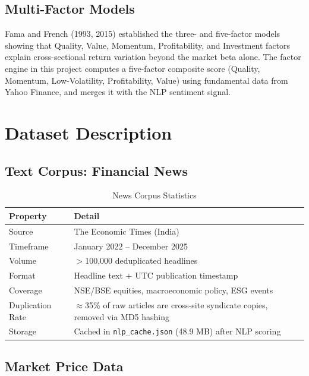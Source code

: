 \documentclass[12pt, a4paper]{article}
\begin{document}
\subsection{Multi-Factor Models}

Fama and French (1993, 2015) established the three- and five-factor models showing that Quality, Value, Momentum, Profitability, and Investment factors explain cross-sectional return variation beyond the market beta alone. The factor engine in this project computes a five-factor composite score (Quality, Momentum, Low-Volatility, Profitability, Value) using fundamental data from Yahoo Finance, and merges it with the NLP sentiment signal.

\section{Dataset Description}

\subsection{Text Corpus: Financial News}

\begin{table}[H]
\centering
\caption{News Corpus Statistics}
\renewcommand{\arraystretch}{1.3}
\begin{tabular}{@{}lp{9cm}@{}}
\toprule
\textbf{Property} & \textbf{Detail} \\ \midrule
Source            & The Economic Times (India) \\
Timeframe         & January 2022 -- December 2025 \\
Volume            & $>$100,000 deduplicated headlines \\
Format            & Headline text + UTC publication timestamp \\
Coverage          & NSE/BSE equities, macroeconomic policy, ESG events \\
Duplication Rate  & $\approx$35\% of raw articles are cross-site syndicate copies, removed via MD5 hashing \\
Storage           & Cached in \texttt{nlp\_cache.json} (48.9 MB) after NLP scoring \\
\bottomrule
\end{tabular}
\end{table}

\subsection{Market Price Data}
\end{document}
